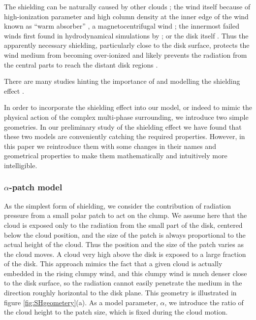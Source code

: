 \documentclass[twocolumn]{aastex62}
\begin{document}
The shielding can be naturally caused by other clouds \citep{Kartje1999}; the wind itself because of high-ionization parameter and high column density at the inner edge of the wind known as ``warm absorber'' \citep{MurrayChiang1995}, a magnetocentrifugal wind \citep{everett2005}; the innermost failed winds first found in hydrodynamical simulations by \citet{proga2000}; or the disk itself \citep{wang_disk2014}. Thus the apparently necessary shielding, particularly close to the disk surface, protects the wind medium from becoming over-ionized and likely prevents the radiation from the central parts to reach the distant disk regions \citep{Miniutti2013}.

There are many studies hinting the importance of and modelling the shielding effect \citep[see e.g.][]{proga2004, Risaliti2010, Sim2010, Higginbottom2013, Nomura2013, Hagino2015, Mizumoto2019}.

In order to incorporate the shielding effect into our model, or indeed to mimic the physical action of the complex multi-phase surrounding, we introduce two simple geometries. In our preliminary study of the shielding effect \citep{Naddaf2020} we have found that these two models are conveniently catching the required properties. However, in this paper we reintroduce them with some changes in their names and geometrical properties to make them mathematically and intuitively more intelligible.

\subsubsection{$\alpha$-patch model}

As the simplest form of shielding, we consider the contribution of radiation pressure from a small polar patch to act on the clump. We assume here that the cloud is exposed only to the radiation from the small part of the disk, centered below the cloud position, and the size of the patch is always proportional to the actual height of the cloud. Thus the position and the size of the patch varies as the cloud moves. A cloud very high above the disk is exposed to a large fraction of the disk. This approach mimics the fact that a given cloud is actually embedded in the rising clumpy wind, and this clumpy wind is much denser close to the disk surface, so the radiation cannot easily penetrate the medium in the direction roughly horizontal to the disk plane. This geometry is illustrated in figure \ref{fig:SHgeometery}(a). As a model parameter, $\alpha$, we introduce the ratio of the cloud height to the patch size, which is fixed during the cloud motion.
\end{document}
